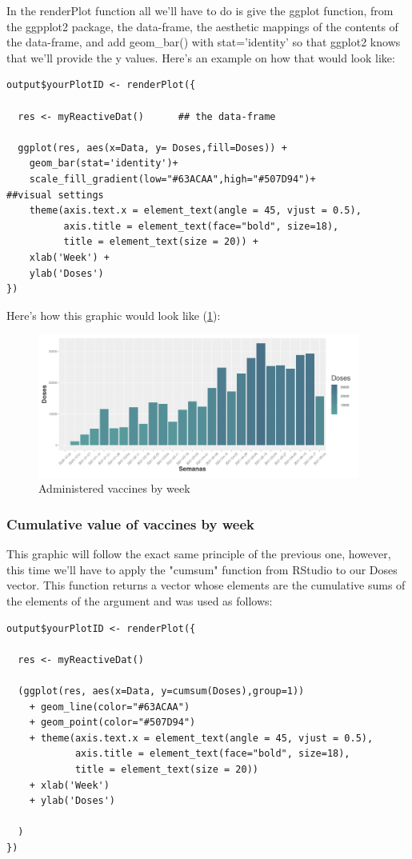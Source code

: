 In the renderPlot function all we'll have to do is give the ggplot function, from the ggpplot2 package, the data-frame, the aesthetic mappings of the contents of the data-frame, and add geom\_bar() with stat='identity' so that ggplot2 knows that we'll provide the y values. Here's an example on how that would look like:

\begin{verbatim}
output$yourPlotID <- renderPlot({

  res <- myReactiveDat()      ## the data-frame

  ggplot(res, aes(x=Data, y= Doses,fill=Doses)) +  
    geom_bar(stat='identity')+ 
    scale_fill_gradient(low="#63ACAA",high="#507D94")+          ##visual settings
    theme(axis.text.x = element_text(angle = 45, vjust = 0.5), 
          axis.title = element_text(face="bold", size=18),
          title = element_text(size = 20)) + 
    xlab('Week') +
    ylab('Doses')
})
\end{verbatim}

Here's how this graphic would look like (\ref{fig:diagrama}):

\begin{figure}[H]
\centering
\includegraphics[width=300pt,trim=10 0 0 -10mm]{images/grafico1novo.png}
\caption{Administered vaccines by week}
\label{fig:diagrama}
\end{figure}

\subsubsection{Cumulative value of vaccines by week}

This graphic will follow the exact same principle of the previous one, however, this time we'll have to apply the "cumsum" function from RStudio to our Doses vector. This function returns a vector whose elements are the cumulative sums of the elements of the argument and was used as follows:

\begin{verbatim}
output$yourPlotID <- renderPlot({
  
  res <- myReactiveDat()
  
  (ggplot(res, aes(x=Data, y=cumsum(Doses),group=1))
    + geom_line(color="#63ACAA")
    + geom_point(color="#507D94") 
    + theme(axis.text.x = element_text(angle = 45, vjust = 0.5),
            axis.title = element_text(face="bold", size=18),
            title = element_text(size = 20))  
    + xlab('Week') 
    + ylab('Doses')
    
  )
})
\end{verbatim}

